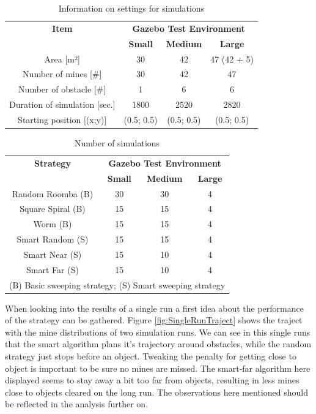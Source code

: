 \documentclass[conference]{IEEEtran}
\begin{document}
\begin{table}[htbp]
\caption{Information on settings for simulations}
\begin{center}
\begin{tabular}{|c|c|c|c|}
\hline
\textbf{Item}&\multicolumn{3}{|c|}{\textbf{Gazebo Test Environment}} \\
\cline{2-4} 
&\textbf{Small}&\textbf{Medium}&\textbf{Large} \\
\hline
Area [m²] & 30 & 42 & 47 (42 + 5)\\ \hline
Number of mines [\#] & 30 & 42 & 47\\ \hline
Number of obstacle [\#] & 1 & 6 & 6\\ \hline
Duration of simulation [sec.] & 1800 & 2520 & 2820\\ \hline
Starting position [(x;y)] & (0.5; 0.5) & (0.5; 0.5) & (0.5; 0.5)\\ \hline
\end{tabular}
\label{tab:SimSet}
\end{center}
\end{table}

\begin{table}[htbp]
\caption{Number of simulations}
\begin{center}
\begin{tabular}{|c|c|c|c|}
\hline
\textbf{ Strategy} &\multicolumn{3}{|c|}{\textbf{Gazebo Test Environment}} \\
\cline{2-4} 
 & \textbf{Small} & \textbf{Medium} & \textbf{Large} \\
\hline
Random Roomba (B) & 30 & 30 & 4 \\
\hline
Square Spiral (B) & 15 & 15 & 4 \\
\hline
Worm (B) & 15 & 15 & 4 \\
\hline
Smart Random (S) & 15 & 15 & 4\\
\hline
Smart Near (S) & 15 & 10 & 4 \\
\hline
Smart Far (S) & 15 & 10 & 4 \\
\hline

\multicolumn{4}{l}{(B) Basic sweeping strategy; (S) Smart sweeping strategy}\\
\end{tabular}
\label{tab:SimRuns}
\end{center}
\end{table}

When looking into the results of a single run a first idea about the performance of the strategy can be gathered. Figure \ref{fig:SingleRunTraject} shows the traject with the mine distributions of two simulation runs. We can see in this single runs that the smart algorithm plans it's trajectory around obstacles, while the random strategy just stops before an object. Tweaking the penalty for getting close to object is important to be sure no mines are missed. The smart-far algorithm here displayed seems to stay away a bit too far from objects, resulting in less mines close to objects cleared on the long run. The observations here mentioned should be reflected in the analysis further on.\\
\end{document}
